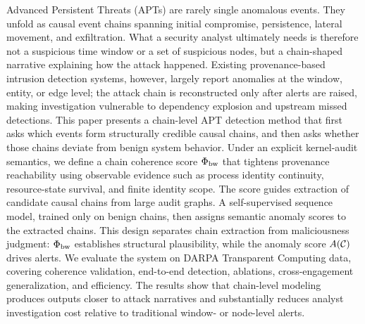 
Advanced Persistent Threats (APTs) are rarely single anomalous events. They unfold as causal event chains spanning initial compromise, persistence, lateral movement, and exfiltration. What a security analyst ultimately needs is therefore not a suspicious time window or a set of suspicious nodes, but a chain-shaped narrative explaining how the attack happened. Existing provenance-based intrusion detection systems, however, largely report anomalies at the window, entity, or edge level; the attack chain is reconstructed only after alerts are raised, making investigation vulnerable to dependency explosion and upstream missed detections. This paper presents a chain-level APT detection method that first asks which events form structurally credible causal chains, and then asks whether those chains deviate from benign system behavior. Under an explicit kernel-audit semantics, we define a chain coherence score $\Phi_{\text{bw}}$ that tightens provenance reachability using observable evidence such as process identity continuity, resource-state survival, and finite identity scope. The score guides extraction of candidate causal chains from large audit graphs. A self-supervised sequence model, trained only on benign chains, then assigns semantic anomaly scores to the extracted chains. This design separates chain extraction from maliciousness judgment: $\Phi_{\text{bw}}$ establishes structural plausibility, while the anomaly score $A(\mathcal{C})$ drives alerts. We evaluate the system on DARPA Transparent Computing data, covering coherence validation, end-to-end detection, ablations, cross-engagement generalization, and efficiency. The results show that chain-level modeling produces outputs closer to attack narratives and substantially reduces analyst investigation cost relative to traditional window- or node-level alerts.
